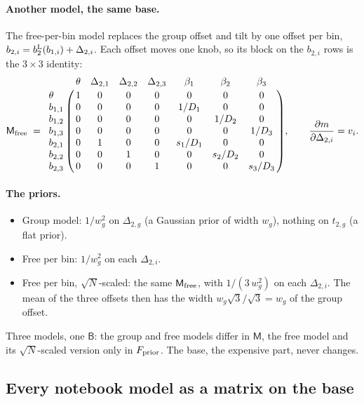 \documentclass[11pt]{article}
\newcommand{\mB}{\mathsf{B}}
\newcommand{\mM}{\mathsf{M}}
\begin{document}
\paragraph{Another model, the same base.}
The free-per-bin model replaces the group offset and tilt by one offset
per bin, $b_{2,i} = b_2^{\rm L}(b_{1,i}) + \Delta_{2,i}$.  Each offset
moves one knob, so its block on the $b_{2,i}$ rows is the $3 \times 3$
identity:
\begin{equation}
  \mM_{\rm free} \;=\; \bordermatrix{
            & \theta & \Delta_{2,1} & \Delta_{2,2} & \Delta_{2,3}
            & \beta_1 & \beta_2 & \beta_3 \cr
    \theta  & 1 & 0 & 0 & 0 & 0       & 0       & 0       \cr
    b_{1,1} & 0 & 0 & 0 & 0 & 1/D_1   & 0       & 0       \cr
    b_{1,2} & 0 & 0 & 0 & 0 & 0       & 1/D_2   & 0       \cr
    b_{1,3} & 0 & 0 & 0 & 0 & 0       & 0       & 1/D_3   \cr
    b_{2,1} & 0 & 1 & 0 & 0 & s_1/D_1 & 0       & 0       \cr
    b_{2,2} & 0 & 0 & 1 & 0 & 0       & s_2/D_2 & 0       \cr
    b_{2,3} & 0 & 0 & 0 & 1 & 0       & 0       & s_3/D_3 \cr} ,
  \qquad
  \frac{\partial m}{\partial \Delta_{2,i}} = v_i .
  \label{eq:toyMfree}
\end{equation}

\paragraph{The priors.}
\begin{itemize}
  \item Group model: $1/w_g^2$ on $\Delta_{2,g}$ (a Gaussian prior of
    width $w_g$), nothing on $t_{2,g}$ (a flat prior).
  \item Free per bin: $1/w_g^2$ on each $\Delta_{2,i}$.
  \item Free per bin, $\sqrt{N}$-scaled: the same $\mM_{\rm free}$, with
    $1/(3\,w_g^2)$ on each $\Delta_{2,i}$.  The mean of the three
    offsets then has the width $w_g\sqrt{3}/\sqrt{3} = w_g$ of the group
    offset.
\end{itemize}
Three models, one $\mB$: the group and free models differ in $\mM$, the
free model and its $\sqrt{N}$-scaled version only in $F_{\rm prior}$.
The base, the expensive part, never changes.

\subsection{Every notebook model as a matrix on the base}
\label{sec:models}
\end{document}
